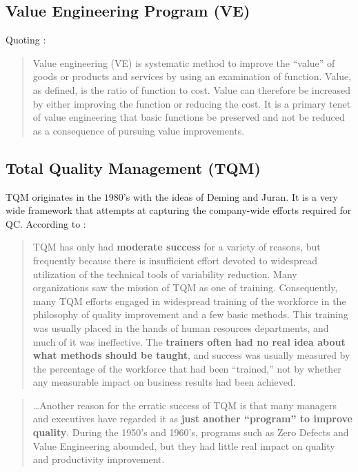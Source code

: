 \documentclass[12pt,a4paper]{report}
\theoremstyle{plain}
\theoremstyle{definition}
\begin{document}
\subsection{Value Engineering Program (VE)}
Quoting \cite{wikipedia_value_2015}:
\begin{quote}
Value engineering (VE) is systematic method to improve the ``value'' of goods or products and services by using an examination of function. Value, as defined, is the ratio of function to cost. Value can therefore be increased by either improving the function or reducing the cost. It is a primary tenet of value engineering that basic functions be preserved and not be reduced as a consequence of pursuing value improvements.

\end{quote}

\subsection{Total Quality Management (TQM)}
TQM originates in the $1980$'s with the ideas of Deming and Juran.
It is a very wide framework that attempts at capturing the company-wide efforts required for QC. 
According to \citet[p.23]{montgomery_introduction_2007}:
\begin{quote}
TQM has only had \textbf{moderate success} for a variety of reasons, but frequently because there is insufficient effort devoted to widespread utilization of the technical tools of variability reduction. Many organizations saw the mission of TQM as one of training. Consequently, many TQM efforts engaged in widespread training of the workforce in the philosophy of quality improvement and a few basic methods.
This training was usually placed in the hands of human resources departments, and much of it was ineffective. The \textbf{trainers often had no real idea about what methods should be taught}, and success was usually measured by the percentage of the workforce that had been ``trained,'' not by whether any measurable impact on business results had been achieved.
\end{quote}

\begin{quote}
\dots Another reason for the erratic success of TQM is that many managers and executives
have regarded it as \textbf{just another “program” to improve quality}. During the 1950's and 1960's, programs such as Zero Defects and Value Engineering abounded, but they had little real impact on quality and productivity improvement.
\end{quote}
\end{document}
